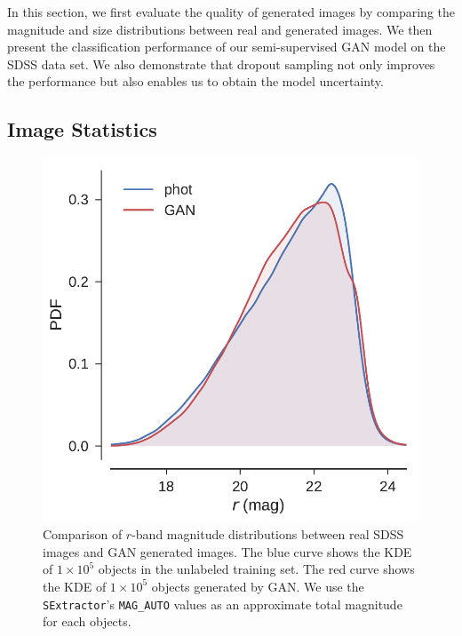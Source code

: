 \documentclass[fleqn,usenatbib]{mnras}
\begin{document}
In this section, we first evaluate the quality of generated images by comparing the magnitude and size distributions
between real and generated images.
We then present the classification performance of our semi-supervised GAN model on the SDSS data set.
We also demonstrate that dropout sampling not only improves the performance but also enables us to obtain the model uncertainty.

\subsection{Image Statistics}
  \label{sec:image_stats}


\begin{figure}
  \centering
  \includegraphics[width=\columnwidth]{figures/mag_kde.pdf}
  \caption{
      Comparison of $r$-band magnitude distributions between real SDSS images and GAN generated images.
      The blue curve shows the KDE of $1 \times 10^5$ objects in the unlabeled training set.
      The red curve shows the KDE of $1 \times 10^5$ objects generated by GAN.
      We use the \texttt{SExtractor}'s \texttt{MAG\_AUTO} values as an approximate total magnitude for each objects.
      }
  \label{fig:mag_kde}
\end{figure}
\end{document}
